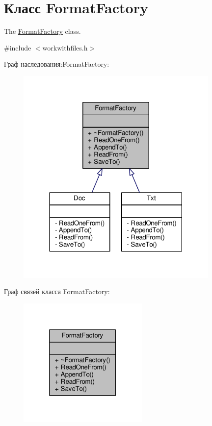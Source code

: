 \hypertarget{class_format_factory}{}\section{Класс Format\+Factory}
\label{class_format_factory}


The \hyperlink{class_format_factory}{Format\+Factory} class.  




{\ttfamily \#include $<$workwithfiles.\+h$>$}



Граф наследования\+:Format\+Factory\+:\nopagebreak
\begin{figure}[H]
\begin{center}
\leavevmode
\includegraphics[width=282pt]{class_format_factory__inherit__graph}
\end{center}
\end{figure}


Граф связей класса Format\+Factory\+:\nopagebreak
\begin{figure}[H]
\begin{center}
\leavevmode
\includegraphics[width=181pt]{class_format_factory__coll__graph}
\end{center}
\end{figure}
